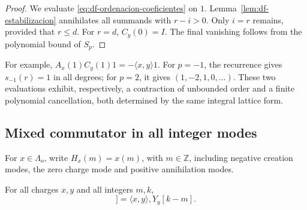 \begin{proof}
We evaluate \eqref{eq:df-ordenacion-coeficientes} on \(1\). Lemma~\ref{lem:df-estabilizacion} annihilates all summands with \(r-i>0\). Only \(i=r\) remains, provided that \(r\leq d\). For \(r=d\), \(C_y(0)=I\). The final vanishing follows from the polynomial bound of \(S_p\).
\end{proof}

For example, \(A_x(1)C_y(1)1=-\langle x,y\rangle1\). For \(p=-1\), the recurrence gives \(s_{-1}(r)=1\) in all degrees; for \(p=2\), it gives \((1,-2,1,0,\ldots)\). These two evaluations exhibit, respectively, a contraction of unbounded order and a finite polynomial cancellation, both determined by the same integral lattice form.

\subsection{Mixed commutator in all integer modes}
\label{subsec:df-conmutador-mixto}


For \(x\in\Lambda_o\), write \(H_x(m)=x(m)\), with \(m\in\mathbb Z\), including negative creation modes, the zero charge mode and positive annihilation modes.

\begin{theorem}
\label{thm:df-conmutador-mixto} For all charges \(x,y\) and all integers \(m,k\),
\begin{equation}
 [H_x(m),Y_y[k]]
 =\langle x,y\rangle,Y_y[k-m].
 \label{eq:df-conmutador-mixto}
\end{equation}
\end{theorem}

